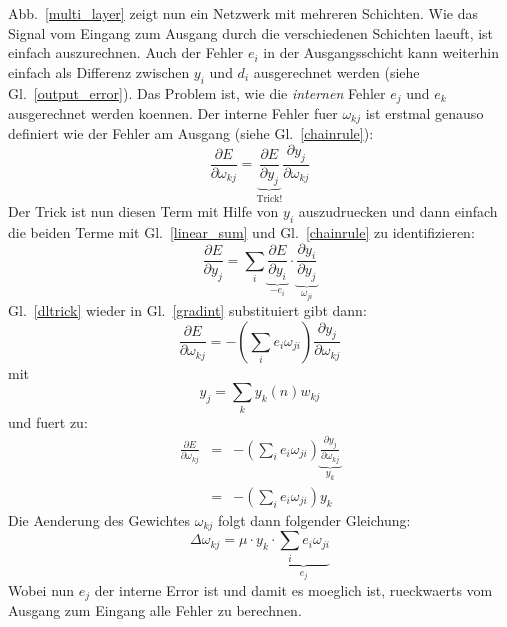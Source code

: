 \documentclass[12pt]{article}
\begin{document}
Abb.~\ref{multi_layer} zeigt nun ein Netzwerk mit mehreren
Schichten. Wie das Signal vom Eingang zum Ausgang durch die
verschiedenen Schichten laeuft, ist einfach auszurechnen. Auch der
Fehler $e_i$ in der Ausgangsschicht kann weiterhin einfach als
Differenz zwischen $y_i$ und $d_i$ ausgerechnet werden (siehe
Gl.~\ref{output_error}). Das Problem ist, wie die \textsl{internen} Fehler
$e_j$ und $e_k$ ausgerechnet werden koennen.
Der interne Fehler fuer $\omega_{kj}$ ist erstmal genauso definiert wie der Fehler
am Ausgang (siehe Gl.~\ref{chainrule}):
\begin{equation}
  \frac{\partial E}{\partial \omega_{kj}} = \underbrace{\frac{\partial E}{\partial y_j}}_\textrm{Trick!} \frac{\partial y_j}{\partial \omega_{kj}}
  \label{gradint}
\end{equation}
Der Trick ist nun diesen Term mit Hilfe von $y_i$ auszudruecken und dann einfach die beiden Terme mit Gl.~\ref{linear_sum} und Gl.~\ref{chainrule} zu identifizieren:
\begin{equation}
  \frac{\partial E}{\partial y_j} = \sum_i \underbrace{\frac{\partial E}{\partial y_i}}_{-e_i} \cdot \underbrace{\frac{\partial y_i}{\partial y_j}}_{\omega_{ji}} \label{dltrick}
\end{equation}
Gl.~\ref{dltrick} wieder in Gl.~\ref{gradint} substituiert gibt dann:
\begin{equation}
  \frac{\partial E}{\partial \omega_{kj}} = - \left( \sum_i e_i \omega_{ji} \right) \frac{\partial y_j}{\partial \omega_{kj}}
  \label{gradint}
\end{equation}
mit
\begin{equation}
y_j = \sum_k y_k(n) w_{kj}
\end{equation}
und fuert zu:
\begin{eqnarray}
  \frac{\partial E}{\partial \omega_{kj}} & = & - \left( \sum_i e_i \omega_{ji} \right) \underbrace{\frac{\partial y_j}{\partial \omega_{kj}}}_{y_k} \\
                                         & = & - \left( \sum_i e_i \omega_{ji} \right) y_k
\end{eqnarray}
Die Aenderung des Gewichtes $\omega_{kj}$ folgt dann folgender Gleichung:
\begin{equation}
\Delta\omega_{kj} = \mu \cdot y_k \cdot \underbrace{\sum_i e_i \omega_{ji}}_{e_j}
\end{equation}
Wobei nun $e_j$ der interne Error ist und damit es moeglich ist, rueckwaerts vom Ausgang zum Eingang alle Fehler zu berechnen.
\end{document}

